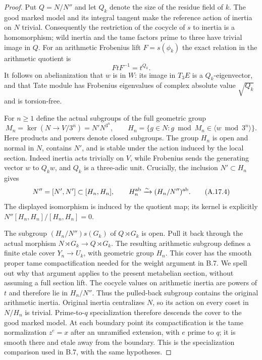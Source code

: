 \begin{proof}
Put $Q=N/N''$ and let $Q_k$ denote the size of the residue
field of $k$. The good marked model and its integral tangent
make the reference action of inertia on $N$ trivial.
Consequently the restriction of the cocycle of $s$ to inertia
is a homomorphism; wild inertia and the tame factors prime
to three have trivial image in $Q$. For an arithmetic
Frobenius lift $F=s(\phi_k)$ the exact relation in the
arithmetic quotient is
\[
 FtF^{-1}=t^{Q_k}.
 \tag{A.17.2}
\]
It follows on abelianization that $w$ is in $W$: its image
in $T_3E$ is a $Q_k$-eigenvector, and that Tate module has
Frobenius eigenvalues of complex absolute value
$\sqrt{Q_k}$ and is torsion-free.

For $n\ge1$ define the actual subgroups of the full geometric
group
\[
 M_n=\ker(N\to V/3^n)=N'N^{3^n},\qquad
 H_n=\{g\in N:g\bmod M_n\in\langle w\bmod3^n\rangle\}.
 \tag{A.17.3}
\]
Here products and powers denote closed subgroups. The group
$H_n$ is open and normal in $N$, contains $N'$, and is stable
under the action induced by the local section. Indeed inertia
acts trivially on $V$, while Frobenius sends the generating
vector $w$ to $Q_kw$, and $Q_k$ is a three-adic unit.
Crucially, the inclusion $N'\subset H_n$ gives
\[
 N''=[N',N']\subset[H_n,H_n],\qquad
 H_n^{\rm ab}\xrightarrow{\sim}(H_n/N'')^{\rm ab}.
 \tag{A.17.4}
\]
The displayed isomorphism is induced by the quotient map;
its kernel is explicitly
$N''[H_n,H_n]/[H_n,H_n]=0$.

The subgroup $(H_n/N'')s(G_k)$ of $Q\rtimes G_k$ is open.
Pull it back through the actual morphism
$N\rtimes G_k\to Q\rtimes G_k$. The resulting arithmetic
subgroup defines a finite etale cover $Y_n\to U_k$, with
geometric group $H_n$. This cover has the smooth proper tame
compactification needed for the weight argument in B.7.
We spell out why that argument applies to the present
metabelian section, without assuming a full section lift.
The cocycle values on arithmetic inertia are powers of $t$
and therefore lie in $H_n/N''$. Thus the pulled-back
subgroup contains the original arithmetic inertia.
Original inertia centralizes $N$, so its action on every
coset in $N/H_n$ is trivial. Prime-to-$q$ specialization
therefore descends the cover to the good marked model.
At each boundary point its compactification is the tame
normalization $z^e=x$ after an unramified extension, with
$e$ prime to $q$; it is smooth there and etale away from
the boundary. This is the specialization comparison used
in B.7, with the same hypotheses.


\end{proof}
